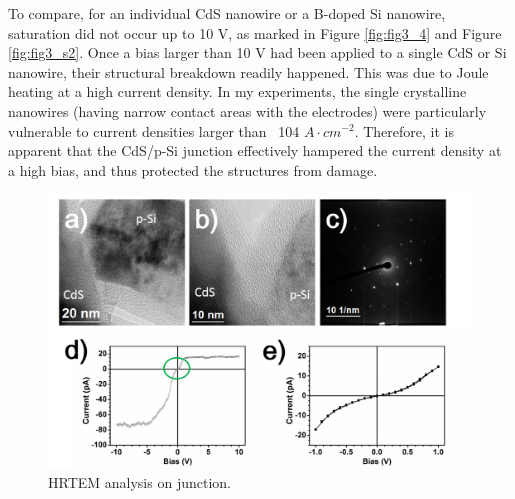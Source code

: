 To compare, for an individual  CdS nanowire or a B-doped Si nanowire, saturation did not occur up to 10 V, as marked in Figure \ref{fig:fig3_4} and Figure \ref{fig:fig3_s2}. Once a bias larger than 10 V had been applied to a single CdS or Si nanowire, their structural breakdown readily happened. This was due to Joule heating at a high current density. \cite{Wu2004} In my experiments, the single crystalline nanowires (having narrow contact areas with the electrodes) were particularly vulnerable to current densities larger than ~104 $A\cdot cm^{-2}$. Therefore, it is apparent that the CdS/p-Si junction effectively hampered the current density at a high bias, and thus protected the structures from damage. 

\begin{figure}  
\includegraphics[width=\textwidth]{figures/figure3_s3}
\caption[HRTEM analysis on junction.]{HRTEM analysis on junction.
\label{fig:fig3_s3}}
\end{figure}

